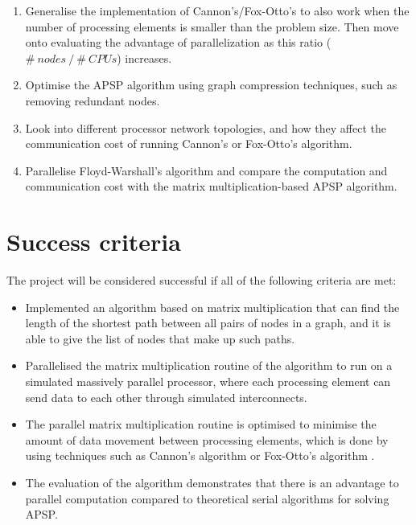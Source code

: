 \documentclass{article}
\begin{document}
\begin{enumerate}
    \item Generalise the implementation of Cannon's/Fox-Otto's to also work when
        the number of processing elements is smaller than the problem size.
        Then move onto evaluating the advantage of parallelization as this ratio
        ( $\#~nodes~/~\#~CPUs$) increases.
    \item Optimise the APSP algorithm using graph compression techniques, such as
        removing redundant nodes.
    \item Look into different processor network topologies, and how they affect
        the communication cost of running Cannon's or Fox-Otto's algorithm.
    \item Parallelise Floyd-Warshall's algorithm and compare the
        computation and communication cost with the matrix multiplication-based
        APSP algorithm.
\end{enumerate}

\section*{Success criteria}%
\label{sec:Success criteria}

The project will be considered successful if all of the following criteria are met:
\begin{itemize}
    \item Implemented an algorithm based on matrix multiplication that can find the
        length of the shortest path between all pairs of nodes in a graph, and it is able
        to give the list of nodes that make up such paths.
    \item Parallelised the matrix multiplication routine of the algorithm to run on a simulated
        massively parallel processor, where each processing element can send data to each
        other through simulated interconnects.
    \item The parallel matrix multiplication routine is optimised to minimise the
        amount of data movement between processing elements, which is done
        by using techniques such as
        Cannon's algorithm or Fox-Otto's algorithm \cite{fox, cannon}.
    \item The evaluation of the algorithm demonstrates that there is an advantage to
        parallel computation compared to theoretical serial algorithms for solving APSP.
\end{itemize}
\end{document}

